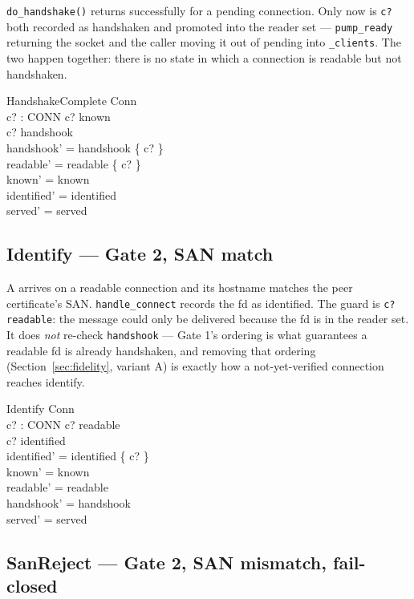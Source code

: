 \documentclass[a4paper,10pt,fleqn]{article}
\begin{document}
\texttt{do\_handshake()} returns successfully for a pending connection.
Only now is \texttt{c?} both recorded as handshaken and promoted into the
reader set --- \texttt{pump\_ready} returning the socket and the caller
moving it out of pending into \texttt{\_clients}.  The two happen together:
there is no state in which a connection is readable but not handshaken.

\begin{schema}{HandshakeComplete}
  \Delta Conn \\
  c? : CONN
\where
  c? \in known \\
  c? \notin handshook \\
  handshook' = handshook \cup \{ c? \} \\
  readable' = readable \cup \{ c? \} \\
  known' = known \\
  identified' = identified \\
  served' = served
\end{schema}

\subsection{Identify --- Gate 2, SAN match}

A  arrives on a readable connection and its
 hostname matches the peer certificate's SAN.
\texttt{handle\_connect} records the fd as identified.  The guard is
\texttt{c? \in readable}: the message could only be delivered because the
fd is in the reader set.  It does \emph{not} re-check \texttt{handshook}
--- Gate 1's ordering is what guarantees a readable fd is already
handshaken, and removing that ordering (Section~\ref{sec:fidelity},
variant A) is exactly how a not-yet-verified connection reaches identify.

\begin{schema}{Identify}
  \Delta Conn \\
  c? : CONN
\where
  c? \in readable \\
  c? \notin identified \\
  identified' = identified \cup \{ c? \} \\
  known' = known \\
  readable' = readable \\
  handshook' = handshook \\
  served' = served
\end{schema}

\subsection{SanReject --- Gate 2, SAN mismatch, fail-closed}
\end{document}
